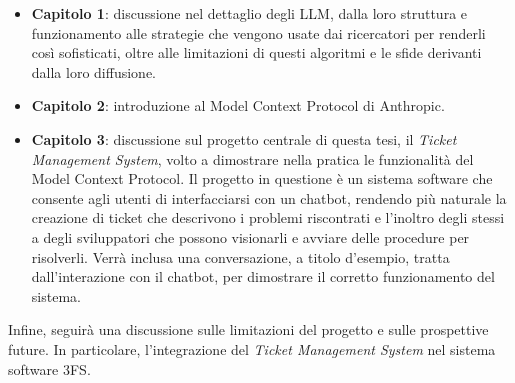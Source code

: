 \begin{itemize}
    \item \textbf{Capitolo 1}: discussione nel dettaglio degli LLM, dalla loro struttura e funzionamento alle strategie che vengono
    usate dai ricercatori per renderli così sofisticati, oltre alle limitazioni di questi algoritmi e le sfide derivanti dalla loro diffusione.
    \item \textbf{Capitolo 2}: introduzione al Model Context Protocol di Anthropic.
    \item \textbf{Capitolo 3}: discussione sul progetto centrale di questa tesi, il \textit{Ticket Management System}, volto a dimostrare
    nella pratica le funzionalità del Model Context Protocol. Il progetto in questione è un sistema software che consente agli utenti di
    interfacciarsi con un chatbot, rendendo più naturale la creazione di ticket che descrivono i problemi riscontrati e l'inoltro degli stessi
    a degli sviluppatori che possono visionarli e avviare delle procedure per risolverli. Verrà inclusa una conversazione, a titolo d'esempio, tratta
    dall'interazione con il chatbot, per dimostrare il corretto funzionamento del sistema.
\end{itemize}
Infine, seguirà una discussione sulle limitazioni del progetto e sulle prospettive future. In particolare, l'integrazione del
\textit{Ticket Management System} nel sistema software 3FS{\textsuperscript{\tiny\textcopyright}}.